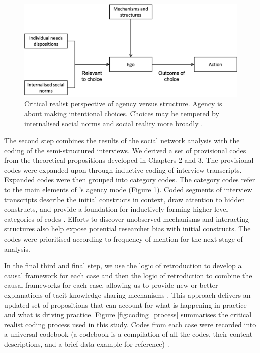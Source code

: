 \begin{figure}[hbt!]
    \centering
    \includegraphics[width = \textwidth]{Images/agency_structure_loyal.png}
    \caption[]{Critical realist perspective of agency versus structure. Agency is about making intentional choices. Choices may be tempered by internalised social norms and social reality more broadly \citep{loyal2001agency}.}
    \label{fig:agency_structure2}
\end{figure}

The second step combines the results of the social network analysis with the coding of the semi-structured interviews. We derived a set of provisional codes from the theoretical propositions developed in Chapters 2 and 3. The provisional codes were expanded upon through inductive coding of interview transcripts. Expanded codes were then grouped into category codes. The category codes refer to the main elements of \citeauthor{loyal2001agency}'s \citeyearpar{loyal2001agency} agency mode (Figure \ref{fig:agency_structure2}). Coded segments of interview transcripts describe the initial constructs in context, draw attention to hidden constructs, and provide a foundation for inductively forming higher-level categories of codes \citep{saldana2015coding}. Efforts to discover unobserved mechanisms and interacting structures also help expose potential researcher bias with initial constructs. The codes were prioritised according to frequency of mention for the next stage of analysis. \medskip

In the final third and final step, we use the logic of retroduction to develop a causal framework for each case and then the logic of retrodiction to combine the causal frameworks for each case, allowing us to provide new or better explanations of tacit knowledge sharing mechanisms \citep{mcavoy2018critical}. This approach delivers an updated set of propositions that can account for what is happening in practice and what is driving practice. Figure \ref{fig:coding_process} summarises the critical realist coding process used in this study. Codes from each case were recorded into a universal codebook (a codebook is a compilation of all the codes, their content descriptions, and a brief data example for reference) \citep{guest2011applied}. 


